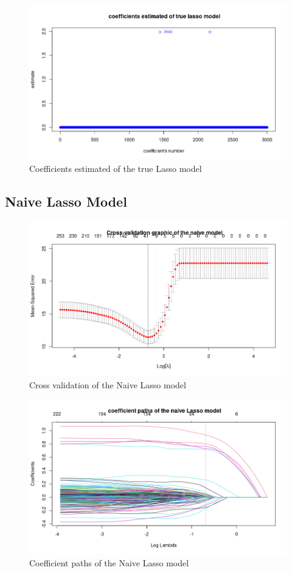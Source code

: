 \documentclass{report}
\begin{document}
\begin{figure}[H]
	\centering
		\includegraphics[scale=0.4]{pictures/cetl.png}
	\caption{Coefficients estimated of the true Lasso model}
	\label{t3}
\end{figure}

\subsection*{Naive Lasso Model}
\begin{figure}[H]
	\centering
		\includegraphics[scale=0.5]{pictures/cvnl.png}
	\caption{Cross validation of the Naive Lasso model}
	\label{t4}
\end{figure}

\begin{figure}[H]
	\centering
		\includegraphics[scale=0.5]{pictures/pnl.png}
	\caption{Coefficient paths of the Naive Lasso model}
	\label{t5}
\end{figure}
\end{document}
